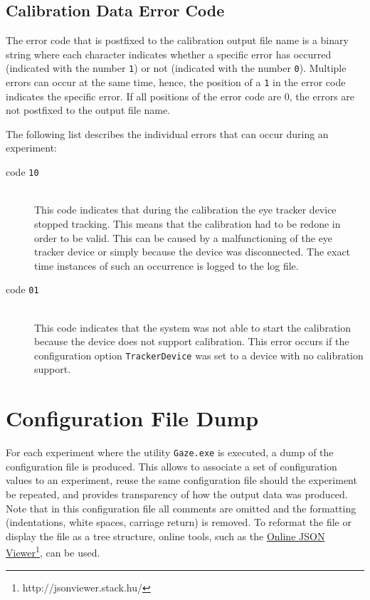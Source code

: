 \documentclass[a4paper,oneside]{book}
\begin{document}
\subsection{Calibration Data Error Code}
\label{sect.calibration.error}
The error code that is postfixed to the calibration output file name is a binary string where each character indicates whether a specific error has occurred (indicated with the number \texttt{1}) or not (indicated with the number \texttt{0}).
Multiple errors can occur at the same time, hence, the position of a \texttt{1} in the error code indicates the specific error.
If all positions of the error code are 0, the errors are not postfixed to the output file name.

The following list describes the individual errors that can occur during an experiment:
\begin{description}
    \item[code \texttt{10}] \hfill \\
        This code indicates that during the calibration the eye tracker device stopped tracking.
        This means that the calibration had to be redone in order to be valid.
        This can be caused by a malfunctioning of the eye tracker device or simply because the device was disconnected.
        The exact time instances of such an occurrence is logged to the log file.
    \item[code \texttt{01}] \hfill \\
        This code indicates that the system was not able to start the calibration because the device does not support calibration.
        This error occurs if the configuration option \texttt{TrackerDevice} was set to a device with no calibration support.
\end{description}


\section{Configuration File Dump}
For each experiment where the utility \texttt{Gaze.exe} is executed, a dump of the configuration file is produced.
This allows to associate a set of configuration values to an experiment, reuse the same configuration file should the experiment be repeated, and provides transparency of how the output data was produced.
Note that in this configuration file all comments are omitted and the formatting (indentations, white spaces, carriage return) is removed.
To reformat the file or display the file as a tree structure, online tools, such as the \href{http://jsonviewer.stack.hu/}{Online JSON Viewer}\footnote{http://jsonviewer.stack.hu/}, can be used.
\end{document}
